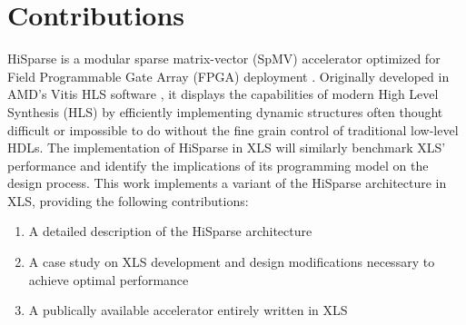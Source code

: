 \section{Contributions}

HiSparse is a modular sparse matrix-vector (SpMV) accelerator optimized for Field Programmable Gate Array (FPGA) deployment \cite{hisparse}. Originally developed in AMD's Vitis HLS software \cite{vitis}, it displays the capabilities of modern High Level Synthesis (HLS) by efficiently implementing dynamic structures often thought difficult or impossible to do without the fine grain control of traditional low-level HDLs. The implementation of HiSparse in XLS will similarly benchmark XLS' performance and identify the implications of its programming model on the design process. This work implements a variant of the HiSparse architecture \cite{hisparse} in XLS, providing the following contributions:


\begin{enumerate}
    \item A detailed description of the HiSparse architecture
    \item A case study on XLS development and design modifications necessary to achieve optimal performance
    \item A publically available accelerator entirely written in XLS
\end{enumerate}









